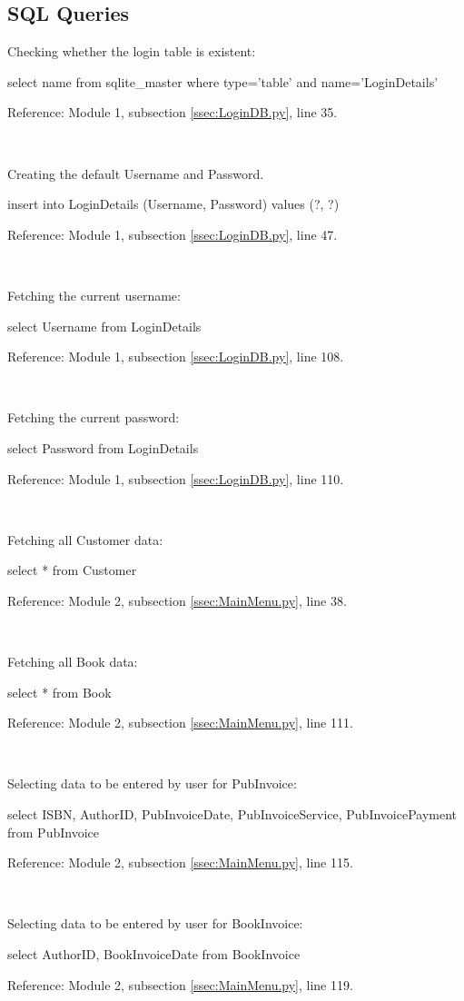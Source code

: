 \subsection{SQL Queries}

Checking whether the login table is existent:
\begin{sql}
select name
from sqlite_master
where type='table' and name='LoginDetails'
\end{sql}
Reference: Module 1,  subsection \ref{ssec:LoginDB.py}, line 35.

\

Creating the default Username and Password.
\begin{sql}
insert into LoginDetails (Username, Password)
values (?, ?)
\end{sql}
Reference: Module 1,  subsection \ref{ssec:LoginDB.py}, line 47.

\

Fetching the current username:
\begin{sql}
select Username
from LoginDetails
\end{sql}
Reference: Module 1,  subsection \ref{ssec:LoginDB.py}, line 108.

\

Fetching the current password:
\begin{sql}
select Password
from LoginDetails
\end{sql}
Reference: Module 1,  subsection \ref{ssec:LoginDB.py}, line 110.

\

Fetching all Customer data:
\begin{sql}
select *
from Customer
\end{sql}
Reference: Module 2,  subsection \ref{ssec:MainMenu.py}, line 38.

\

Fetching all Book data:
\begin{sql}
select *
from Book
\end{sql}
Reference: Module 2,  subsection \ref{ssec:MainMenu.py}, line 111.

\

Selecting data to be entered by user for PubInvoice:
\begin{sql}
select ISBN, AuthorID, PubInvoiceDate, PubInvoiceService, PubInvoicePayment
from PubInvoice
\end{sql}
Reference: Module 2,  subsection \ref{ssec:MainMenu.py}, line 115.

\

Selecting data to be entered by user for BookInvoice:
\begin{sql}
select AuthorID, BookInvoiceDate
from BookInvoice
\end{sql}
Reference: Module 2,  subsection \ref{ssec:MainMenu.py}, line 119.

